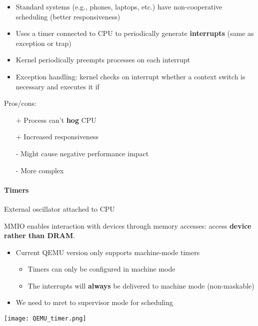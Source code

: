 \newpar{}
\begin{itemize}
    \item Standard systems (e.g., phones, laptops, etc.) have non-cooperative scheduling (better responsiveness)
    \item Uses a timer connected to CPU to periodically generate \textbf{interrupts} (same as exception or trap)
    \item Kernel periodically preempts processes on each interrupt
    \item Exception handling: kernel checks on interrupt whether a context switch is necessary and executes it if
\end{itemize}
Pros/cons:
\begin{itemize}
    \item[+] Process can't \textbf{hog} CPU
    \item[+] Increased responsiveness
    \item[-] Might cause negative performance impact
    \item[-] More complex
\end{itemize}

\paragraph{Timers}
External oscillator attached to CPU

\newpar{}

MMIO enables interaction with devices through memory accesses: access \textbf{device rather than DRAM}.

\newpar{}

\begin{itemize}
    \item Current QEMU version only supports machine-mode timers
          \begin{itemize}
              \item Timers can only be configured in machine mode
              \item The interrupts will \textbf{always} be delivered to machine mode (non-maskable)
          \end{itemize}
    \item We need to mret to supervisor mode for scheduling
\end{itemize}
\begin{center}
    \texttt{[image: QEMU\_timer.png]}
\end{center}

